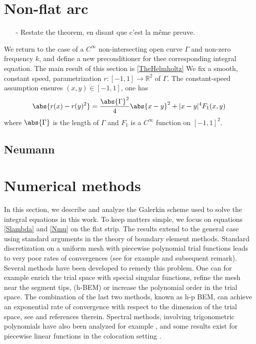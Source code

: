 \documentclass[a4paper]{article}
\begin{document}
	
	
	
	\section{Non-flat arc}
	
	\begin{itemize}
		\item[-] Restate the theorem, en disant que c'est la même preuve. 
	\end{itemize}
	
	We return to the case of a $C^{\infty}$ non-intersecting open curve $\Gamma$ and non-zero frequency $k$, and define a new preconditioner for thee corresponding integral equation. The main result of this section is \autoref{TheHelmholtz} We fix a smooth, constant speed, parametrization $r : [-1,1] \to \mathbb{R}^2$ of $\Gamma$. The constant-speed assumption ensures $(x,y) \in [-1,1]$, one has
	\begin{equation}
	\abs{r(x) - r(y)^2} = \frac{\abs{\Gamma}^2}{4} \abs{x - y}^2 + |x-y|^4 F_1(x,y)
	\label{DLcourbe_param}
	\end{equation}
	where $\abs{\Gamma}$ is the length of $\Gamma$ and $F_1$ is a $C^{\infty}$ function on $[-1,1]^2$.
	
	
	\subsection{Neumann}
	
	
	\section{Numerical methods}
	\label{sec:numerMeth}
	
	In this section, we describe and analyze the Galerkin scheme used to solve the integral equations in this work. To keep matters simple, we focus on equations \eqref{Slambda} and \eqref{Nmu} on the flat strip. The results extend to the general case using standard arguments in the theory of boundary element methods. Standard discretization on a uniform mesh with piecewise polynomial trial functions leads to very poor rates of convergences (see for example \cite[Chap. 4, ]{sauter2011boundary} and subsequent remark). Several methods have been developed to remedy this problem. One can for example enrich the trial space with special singular functions, refine the mesh near the segment tips, (h-BEM) or increase the polynomial order in the trial space. The combination of the last two methods, known as h-p BEM, can achieve an exponential rate of convergence with respect to the dimension of the trial space, see \cite{postell1990h} and references therein. Spectral methods, involving trigonometric polynomials have also been analyzed for example \cite{bruno2012second}, and some results exist for piecewise linear functions in the colocation setting \cite{costabel1988convergence}. 
	
\end{document}
